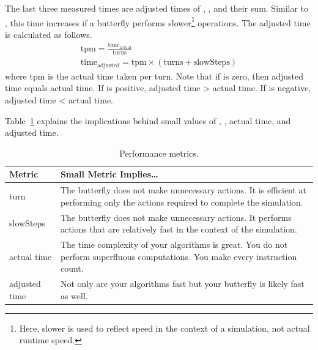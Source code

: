\documentclass{pset}
\begin{document}
The last three measured times are adjusted times of ,  ,
and their sum. Similar to , this time increases if a butterfly
performs slower\footnote{Here, slower is used to reflect speed in the context
of a simulation, not actual runtime speed.} operations. The adjusted time is
calculated as follows. 
\begin{gather*}
    \text{tpm} = \frac{\text{time}_{\text{actual}}}{\text{turns}} \\
    \text{time}_{\text{adjusted}} = \text{tpm} \times (\text{turns} +
    \text{slowSteps})
\end{gather*}
where tpm is the actual time taken per turn. Note that if  is
zero, then adjusted time equals actual time. If  is positive,
adjusted time > actual time. If  is negative, adjusted time <
actual time.

Table~\ref{table:metrics} explains the implications behind small values of
, , actual time, and adjusted time.

\begin{table}[H]
    \center
    \begin{tabularx}{\textwidth}{|l|X|}
        \hline
        \textbf{Metric} & \textbf{Small Metric Implies\ldots} \\\hline
        turn &
        The butterfly does not make unnecessary actions. It is efficient at
        performing only the actions required to complete the
        simulation.\\\hline
        slowSteps &
        The butterfly does not make unnecessary actions. It performs actions
        that are relatively fast in the context of the simulation. \\\hline
        actual time &
        The time complexity of your algorithms is great. You do not perform
        superfluous computations. You make every instruction count. \\\hline
        adjusted time &
        Not only are your algorithms fast but your butterfly is likely fast as
        well. \\\hline
    \end{tabularx}
    \caption{Performance metrics.}
    \label{table:metrics}
\end{table}
\fi
\fi


\ifx \MAPS \undefined \else
\end{document}
